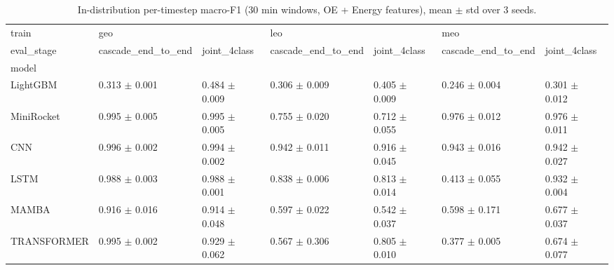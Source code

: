 \begin{table}
\centering
\caption{In-distribution per-timestep macro-F1 (30 min windows, OE + Energy features), mean $\pm$ std over 3 seeds.}
\label{tab:main}
\begin{tabular}{lllllll}
\toprule
train & \multicolumn{2}{l}{geo} & \multicolumn{2}{l}{leo} & \multicolumn{2}{l}{meo} \\
eval_stage & cascade_end_to_end &       joint_4class & cascade_end_to_end &       joint_4class & cascade_end_to_end &       joint_4class \\
model       &                    &                    &                    &                    &                    &                    \\
\midrule
LightGBM    &  0.313 $\pm$ 0.001 &  0.484 $\pm$ 0.009 &  0.306 $\pm$ 0.009 &  0.405 $\pm$ 0.009 &  0.246 $\pm$ 0.004 &  0.301 $\pm$ 0.012 \\
MiniRocket  &  0.995 $\pm$ 0.005 &  0.995 $\pm$ 0.005 &  0.755 $\pm$ 0.020 &  0.712 $\pm$ 0.055 &  0.976 $\pm$ 0.012 &  0.976 $\pm$ 0.011 \\
CNN         &  0.996 $\pm$ 0.002 &  0.994 $\pm$ 0.002 &  0.942 $\pm$ 0.011 &  0.916 $\pm$ 0.045 &  0.943 $\pm$ 0.016 &  0.942 $\pm$ 0.027 \\
LSTM        &  0.988 $\pm$ 0.003 &  0.988 $\pm$ 0.001 &  0.838 $\pm$ 0.006 &  0.813 $\pm$ 0.014 &  0.413 $\pm$ 0.055 &  0.932 $\pm$ 0.004 \\
MAMBA       &  0.916 $\pm$ 0.016 &  0.914 $\pm$ 0.048 &  0.597 $\pm$ 0.022 &  0.542 $\pm$ 0.037 &  0.598 $\pm$ 0.171 &  0.677 $\pm$ 0.037 \\
TRANSFORMER &  0.995 $\pm$ 0.002 &  0.929 $\pm$ 0.062 &  0.567 $\pm$ 0.306 &  0.805 $\pm$ 0.010 &  0.377 $\pm$ 0.005 &  0.674 $\pm$ 0.077 \\
\bottomrule
\end{tabular}
\end{table}
